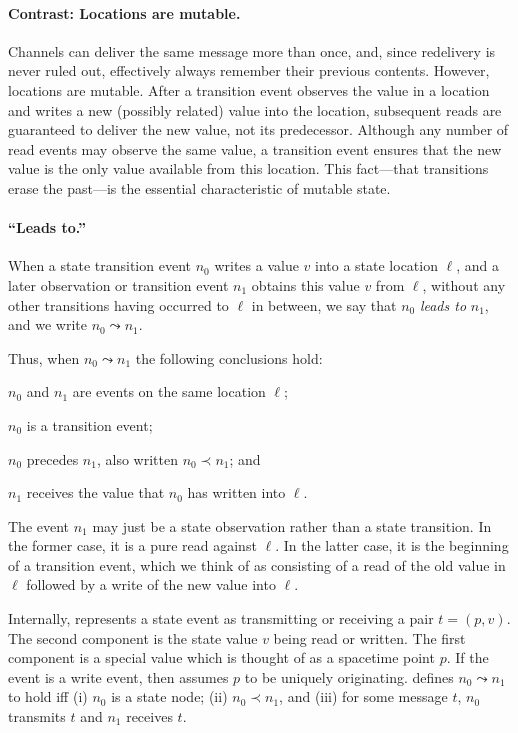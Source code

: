 \paragraph{Contrast:  Locations are mutable.}  Channels can deliver
the same message more than once, and, since redelivery is never ruled
out, effectively always remember their previous contents.  However,
locations are mutable.  After a transition event observes the value in
a location and writes a new (possibly related) value into the
location, subsequent reads are guaranteed to deliver the new value,
not its predecessor.  Although any number of read events may observe
the same value, a transition event ensures that the new value is the
only value available from this location.  This fact---that transitions
erase the past---is the essential characteristic of mutable state.


\paragraph{``Leads to.''}  When a state transition event $n_0$ writes
a value $v$ into a state location $\ell$, and a later observation or
transition event $n_1$ obtains this value $v$ from $\ell$, without any
other transitions having occurred to $\ell$ in between, we say that
$n_0$ \emph{leads to} $n_1$, and we write $n_0\leadsto n_1$.


Thus, when $n_0\leadsto n_1$ the following conclusions hold:
\begin{renumerate}
  \item $n_0$ and $n_1$ are events on the same location $\ell$;
  \item  $n_0$ is a transition event;
  \item $n_0$ precedes $n_1$, also written $n_0\prec n_1$; and
  \item $n_1$ receives the value that $n_0$ has written into $\ell$.
\end{renumerate}
%
The event $n_1$ may just be a state observation rather than a state
transition.  In the former case, it is a pure read against $\ell$.  In
the latter case, it is the beginning of a transition event, which we
think of as consisting of a read of the old value in $\ell$ followed
by a write of the new value into $\ell$.

Internally, {\cpsa} represents a state event as transmitting or
receiving a pair $t=(p,v)$.  The second component is the state value
$v$ being read or written.  The first component is a special value
which is thought of as a spacetime point $p$.  If the event is a write
event, then {\cpsa} assumes $p$ to be uniquely originating.  {\cpsa}
defines $n_0\leadsto n_1$ to hold iff (i) $n_0$ is a state node; (ii)
$n_0\prec n_1$, and (iii) for some message $t$, $n_0$ transmits $t$
and $n_1$ receives $t$.

